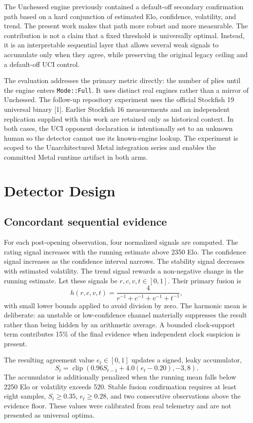 \documentclass[conference]{IEEEtran}
\begin{document}
The Unchessed engine previously contained a default-off secondary confirmation path based on a hard conjunction of estimated Elo, confidence, volatility, and trend. The present work makes that path more robust and more measurable. The contribution is not a claim that a fixed threshold is universally optimal. Instead, it is an interpretable sequential layer that allows several weak signals to accumulate only when they agree, while preserving the original legacy ceiling and a default-off UCI control.

The evaluation addresses the primary metric directly: the number of plies until the engine enters \texttt{Mode::Full}. It uses distinct real engines rather than a mirror of Unchessed. The follow-up repository experiment uses the official Stockfish 19 universal binary [1]. Earlier Stockfish 16 measurements and an independent replication supplied with this work are retained only as historical context. In both cases, the UCI opponent declaration is intentionally set to an unknown human so the detector cannot use its known-engine lookup. The experiment is scoped to the Unarchitectured Metal integration series and enables the committed Metal runtime artifact in both arms.

\section{Detector Design}
\subsection{Concordant sequential evidence}
For each post-opening observation, four normalized signals are computed. The rating signal increases with the running estimate above 2350 Elo. The confidence signal increases as the confidence interval narrows. The stability signal decreases with estimated volatility. The trend signal rewards a non-negative change in the running estimate. Let these signals be $r,c,v,t\in[0,1]$. Their primary fusion is
\begin{equation}
 h(r,c,v,t)=\frac{4}{r^{-1}+c^{-1}+v^{-1}+t^{-1}},
\end{equation}
with small lower bounds applied to avoid division by zero. The harmonic mean is deliberate: an unstable or low-confidence channel materially suppresses the result rather than being hidden by an arithmetic average. A bounded clock-support term contributes 15\% of the final evidence when independent clock suspicion is present.

The resulting agreement value $e_t\in[0,1]$ updates a signed, leaky accumulator,
\begin{equation}
 S_t=\operatorname{clip}(0.96S_{t-1}+4.0(e_t-0.20),-3,8).
\end{equation}
The accumulator is additionally penalized when the running mean falls below 2250 Elo or volatility exceeds 520. Stable fusion confirmation requires at least eight samples, $S_t\geq0.35$, $e_t\geq0.28$, and two consecutive observations above the evidence floor. These values were calibrated from real telemetry and are not presented as universal optima.
\end{document}
